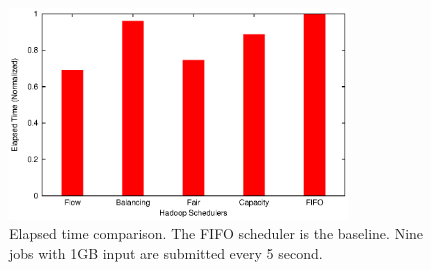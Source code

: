 \begin{figure}[ht]
    \centering
    \includegraphics[width=0.8\textwidth]{figures/elapsed_time.eps}
    \caption{Elapsed time comparison.  The FIFO scheduler is the baseline.  Nine jobs with 1GB input are submitted every 5 second.}
    \label{fig:het_elapsed}
\end{figure}

